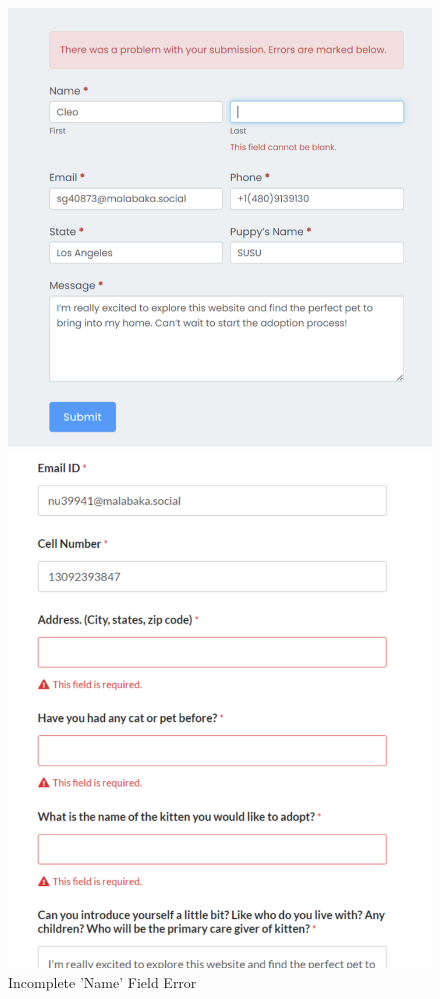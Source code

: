 \documentclass[ oneside,%
                    author={Cassie Qing Tang},
                    degree={BSc},
                     title={An Automated Response System for Disrupting Online Pet Scamming \\ },
                    subtitle={ }]{dissertation}
\begin{document}
\begin{figure}[H]
    \centering
    \begin{minipage}{0.45\textwidth}
        \includegraphics[width=\linewidth]{pic/figure10.png}
        \caption{Incomplete 'Name' Field Error}
        \label{fig:pic10}
    \end{minipage}
    \hfill 
    \begin{minipage}{0.45\textwidth}
        \includegraphics[width=\linewidth, height=0.3\textheight]{pic/figure11.png}

\end{minipage}
\end{figure}
\end{document}
